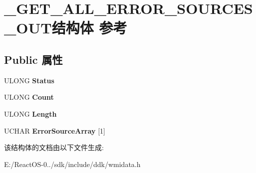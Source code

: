 \hypertarget{struct___g_e_t___a_l_l___e_r_r_o_r___s_o_u_r_c_e_s___o_u_t}{}\section{\+\_\+\+G\+E\+T\+\_\+\+A\+L\+L\+\_\+\+E\+R\+R\+O\+R\+\_\+\+S\+O\+U\+R\+C\+E\+S\+\_\+\+O\+U\+T结构体 参考}
\label{struct___g_e_t___a_l_l___e_r_r_o_r___s_o_u_r_c_e_s___o_u_t}
\subsection*{Public 属性}
\begin{DoxyCompactItemize}
\item 
\mbox{\label{struct___g_e_t___a_l_l___e_r_r_o_r___s_o_u_r_c_e_s___o_u_t_a7a3341162286c2bca3b96afa0690f8dd}} 
U\+L\+O\+NG {\bfseries Status}
\item 
\mbox{\label{struct___g_e_t___a_l_l___e_r_r_o_r___s_o_u_r_c_e_s___o_u_t_a35b8c67510ae747c35da8a0449363aa9}} 
U\+L\+O\+NG {\bfseries Count}
\item 
\mbox{\label{struct___g_e_t___a_l_l___e_r_r_o_r___s_o_u_r_c_e_s___o_u_t_af35ee572f1dfdbe750e70e32f060eb99}} 
U\+L\+O\+NG {\bfseries Length}
\item 
\mbox{\label{struct___g_e_t___a_l_l___e_r_r_o_r___s_o_u_r_c_e_s___o_u_t_a1dc4832d02dae941c06c503dbe2ed2fe}} 
U\+C\+H\+AR {\bfseries Error\+Source\+Array} \mbox{[}1\mbox{]}
\end{DoxyCompactItemize}


该结构体的文档由以下文件生成\+:\begin{DoxyCompactItemize}
\item 
E\+:/\+React\+O\+S-\/0../sdk/include/ddk/wmidata.\+h\end{DoxyCompactItemize}
